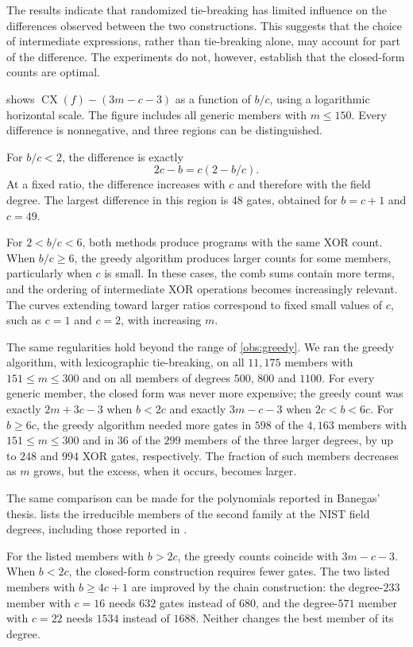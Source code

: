 \documentclass{ieeeaccess}
\theoremstyle{plain}
\theoremstyle{definition}
\newcommand{\CX}{\operatorname{CX}}
\begin{document}
The results indicate that randomized tie-breaking has limited influence on the
differences observed between the two constructions. This suggests that the
choice of intermediate expressions, rather than tie-breaking alone, may account
for part of the difference. The experiments do not, however, establish that the
closed-form counts are optimal.

 shows $\CX(f)-(3m-c-3)$ as a function of $b/c$, using a
logarithmic horizontal scale. The figure includes all generic members with
$m\le150$. Every difference is nonnegative, and three regions can be
distinguished.

For $b/c<2$, the difference is exactly
\[
  2c-b=c(2-b/c).
\]
At a fixed ratio, the difference increases with $c$ and therefore with the field
degree. The largest difference in this region is $48$ gates, obtained for
$b=c+1$ and $c=49$.

For $2<b/c<6$, both methods produce programs with the same XOR count. When
$b/c\ge6$, the greedy algorithm produces larger counts for some members,
particularly when $c$ is small. In these cases, the comb sums contain more
terms, and the ordering of intermediate XOR operations becomes increasingly
relevant. The curves extending toward larger ratios correspond to fixed small
values of $c$, such as $c=1$ and $c=2$, with increasing $m$.

The same regularities hold beyond the range of \cref{obs:greedy}. We ran the
greedy algorithm, with lexicographic tie-breaking, on all $11,175$ members with
$151\le m\le300$ and on all members of degrees $500$, $800$ and $1100$. For every
generic member, the closed form was never more expensive; the greedy count was
exactly $2m+3c-3$ when $b<2c$ and exactly $3m-c-3$ when $2c<b<6c$. For $b\ge6c$,
the greedy algorithm needed more gates in $598$ of the $4,163$ members with
$151\le m\le300$ and in $36$ of the $299$ members of the three larger degrees, by
up to $248$ and $994$ XOR gates, respectively. The fraction of such members
decreases as $m$ grows, but the excess, when it occurs, becomes larger.

The same comparison can be made for the polynomials reported in Banegas' thesis.
 lists the irreducible members of the second family at the NIST
field degrees, including those reported in \cite[Tab.~17]{Banegas2015}.

For the listed members with $b>2c$, the greedy counts coincide with $3m-c-3$.
When $b<2c$, the closed-form construction requires fewer gates. The two listed
members with $b\ge4c+1$ are improved by the chain construction: the degree-$233$
member with $c=16$ needs $632$ gates instead of $680$, and the degree-$571$
member with $c=22$ needs $1534$ instead of $1688$. Neither changes the best
member of its degree.
\end{document}
